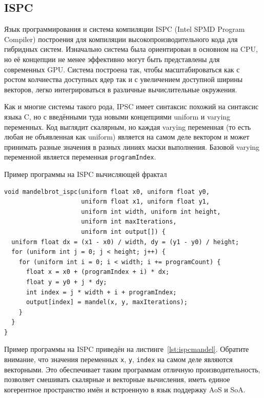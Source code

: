 \subsection{ISPC}\label{subsec:overview/vectorapi/ispc}

Язык программирования и система компиляции ISPC (Intel SPMD Program Compiler) построения для компиляции высокопроизводительного кода для гибридных систем. Изначально система была ориентирован в основном на CPU, но её концепции не менее эффективно могут быть представлены для современных GPU. Система построена так, чтобы масштабироваться как с ростом колчиества доступных ядер так и с увеличением доступной ширины векторов, легко интегрироваться в различные вычислительные окружения.

Как и многие системы такого рода, IPSC имеет синтаксис похожий на синтаксис языка C, но с введёнными туда новыми концепциями uniform и varying переменных. Код выглядит скалярным, но каждая varying переменная (то есть любая не объявленная как uniform) является на самом деле вектором и может принимать разные значения в разных линиях маски выполнения. Базовой varying переменной является переменная \lstinline!programIndex!.

\begin{ListingEnv}[!h]
    \captiondelim{ } 
    \caption{Пример программы на ISPC вычисляющей фрактал}\label{lst:ispcmandel}
    \begin{lstlisting}[language={[ISO]C++}]
void mandelbrot_ispc(uniform float x0, uniform float y0,
                     uniform float x1, uniform float y1,
                     uniform int width, uniform int height,
                     uniform int maxIterations,
                     uniform int output[]) {
  uniform float dx = (x1 - x0) / width, dy = (y1 - y0) / height;
  for (uniform int j = 0; j < height; j++) {
    for (uniform int i = 0; i < width; i += programCount) {
      float x = x0 + (programIndex + i) * dx;
      float y = y0 + j * dy;
      int index = j * width + i + programIndex;
      output[index] = mandel(x, y, maxIterations);
    }
  }
}
    \end{lstlisting}
\end{ListingEnv}

Пример программы на ISPC приведён на листинге~\cref{lst:ispcmandel}. Обратите внимание, что значения переменных \lstinline!x!, \lstinline!y!, \lstinline!index! на самом деле являются векторными. Это обеспечивает таким программам отличную производительность, позволяет смешивать скалярные и векторные вычисления, иметь единое когерентное пространство имён и встроенную в язык поддержку AoS и SoA.

